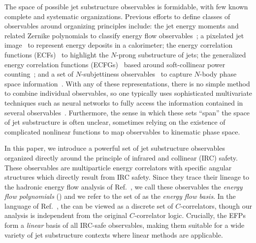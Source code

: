 \documentclass[letterpaper,11pt]{article}
\DeclareRobustCommand{\Ref}[1]{Ref.~\cite{#1}}
\newcommand{\Bs}{\text{EFPs}\xspace}
\begin{document}
The space of possible jet substructure observables is formidable, with few known complete and systematic organizations.
%
Previous efforts to define classes of observables around organizing principles include:
%
the jet energy moments and related Zernike polynomials to classify energy flow observables~\cite{GurAri:2011vx};
%
a pixelated jet image~\cite{Cogan:2014oua} to represent energy deposits in a calorimeter;
%
the energy correlation functions (ECFs)~\cite{Larkoski:2013eya} to highlight the $N$-prong substructure of jets;
%
the generalized energy correlation functions (ECFGs)~\cite{Moult:2016cvt} based around soft-collinear power counting~\cite{Larkoski:2014gra};
%
and a set of $N$-subjettiness observables~\cite{Thaler:2010tr,Thaler:2011gf,Stewart:2010tn} to capture $N$-body phase space information~\cite{Datta:2017rhs}.
%
With any of these representations, there is no simple method to combine individual observables, so one typically uses sophisticated multivariate techniques such as neural networks to fully access the information contained in several observables~\cite{Gallicchio:2010dq,Gallicchio:2011xq,Gallicchio:2012ez,Baldi:2014kfa,Baldi:2014pta,deOliveira:2015xxd,Barnard:2016qma,Komiske:2016rsd,Kasieczka:2017nvn,Almeida:2015jua,Baldi:2016fql,Guest:2016iqz,Louppe:2017ipp,Pearkes:2017hku,Butter:2017cot,Aguilar-Saavedra:2017rzt,Datta:2017rhs}.
%
Furthermore, the sense in which these sets ``span'' the space of jet substructure is often unclear, sometimes relying on the existence of complicated nonlinear functions to map observables to kinematic phase space.

In this paper, we introduce a powerful set of jet substructure observables organized directly around the principle of infrared and collinear (IRC) safety.
%
These observables are multiparticle energy correlators with specific angular structures which directly result from IRC safety.
%
Since they trace their lineage to the hadronic energy flow analysis of \Ref{Tkachov:1995kk}, we call these observables the \emph{energy flow polynomials} (\Bs) and we refer to the set of \Bs as the \emph{energy flow basis}.
%
In the language of \Ref{Tkachov:1995kk}, the \Bs can be viewed as a discrete set of $C$-correlators, though our analysis is independent from the original $C$-correlator logic.
%
Crucially, the EFPs form a \emph{linear} basis of all IRC-safe observables, making them suitable for a wide variety of jet substructure contexts where linear methods are applicable.
\end{document}
